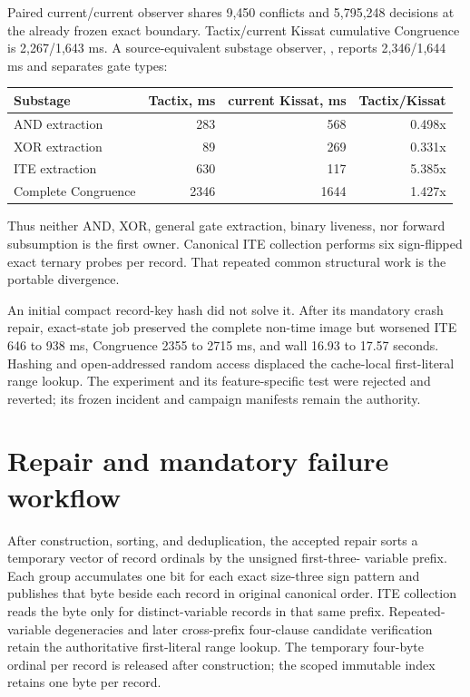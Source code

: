 \documentclass[11pt]{article}
\newcommand{\code}[1]{\texttt{\detokenize{#1}}}
\begin{document}
Paired current/current observer \code{1645876} shares 9,450 conflicts and
5,795,248 decisions at the already frozen exact boundary.  Tactix/current
Kissat cumulative Congruence is 2,267/1,643 ms.  A source-equivalent substage
observer, \code{1645878}, reports 2,346/1,644 ms and separates gate types:

\begin{center}
\small
\begin{tabular}{@{}lrrr@{}}
\toprule
Substage & Tactix, ms & current Kissat, ms & Tactix/Kissat \\
\midrule
AND extraction & 283 & 568 & 0.498x \\
XOR extraction & 89 & 269 & 0.331x \\
ITE extraction & 630 & 117 & 5.385x \\
Complete Congruence & 2346 & 1644 & 1.427x \\
\bottomrule
\end{tabular}
\end{center}

Thus neither AND, XOR, general gate extraction, binary liveness, nor forward
subsumption is the first owner.  Canonical ITE collection performs six
sign-flipped exact ternary probes per record.  That repeated common structural
work is the portable divergence.

An initial compact record-key hash did not solve it.  After its mandatory crash
repair, exact-state job \code{1645880} preserved the complete non-time image but
worsened ITE 646 to 938 ms, Congruence 2355 to 2715 ms, and wall 16.93 to
17.57 seconds.  Hashing and open-addressed random access displaced the
cache-local first-literal range lookup.  The experiment and its feature-specific
test were rejected and reverted; its frozen incident and campaign manifests
remain the authority.

\section{Repair and mandatory failure workflow}
After \code{ClauseIndex} construction, sorting, and deduplication, the accepted
repair sorts a temporary vector of record ordinals by the unsigned first-three-
variable prefix.  Each group accumulates one bit for each exact size-three sign
pattern and publishes that byte beside each record in original canonical
order.  ITE collection reads the byte only for distinct-variable records in
that same prefix.  Repeated-variable degeneracies and later cross-prefix
four-clause candidate verification retain the authoritative first-literal
range lookup.  The temporary four-byte ordinal per record is released after
construction; the scoped immutable index retains one byte per record.
\end{document}
